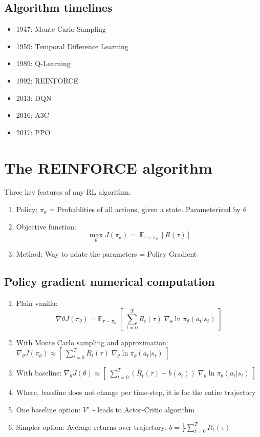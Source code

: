 \documentclass[]{article}
\begin{document}
\subsection{Algorithm timelines}
\begin{itemize}
	\item 1947: Monte Carlo Sampling
	\item 1959: Temporal Difference Learning
	\item 1989: Q-Learning
	\item 1992: REINFORCE
	\item 2013: DQN
	\item 2016: A3C
	\item 2017: PPO 
\end{itemize}

\section{The REINFORCE algorithm}
Three key features of any RL algorithm:
\begin{enumerate}
	\item Policy: $\pi_\theta$ = Probablities of all actions, given a state. Parameterized by $\theta$
	\item Objective function:
	\begin{equation}
		\max_{\theta} J(\pi_{\theta}) = \mathop{\mathbb{E}}_{\tau \sim \pi_\theta} [R(\tau)]
	\end{equation}
	\item Method: Way to udate the parameters = Policy Gradient

\end{enumerate}

\subsection{Policy gradient numerical computation}

\begin{enumerate}
	\item Plain vanilla: 
	\begin{equation}
		\nabla \theta J(\pi_\theta) = \mathbb{E}_{\tau \sim \pi_\theta} \; [ \; \sum_{t=0}^T R_t(\tau) \; \nabla_\theta \ln \pi_\theta(a_t \vert s_t) \;]
	\end{equation}
	\item With Monte Carlo sampling and approximation: $\nabla_\theta J(\pi_\theta) \approx [ \; \sum_{t=0}^T R_t(\tau) \; \nabla_\theta \ln \pi_\theta(a_t \vert s_t) \;]$
	\item With baseline: $\nabla_\theta J(\theta) \approx [ \; \sum_{t=0}^T (R_t(\tau) - b(s_t)) \; \nabla_\theta \ln \pi_\theta(a_t \vert s_t) \;]$
	\item Where, baseline does not change per time-step, it is for the entire trajectory
	\item One baseline option: $V^\pi$ - leads to Actor-Critic algorithm
	\item Simpler option: Average returns over trajectory: $b = \frac{1}{T}\sum_{t=0}^T R_t(\tau) $
\end{enumerate}
\end{document}
